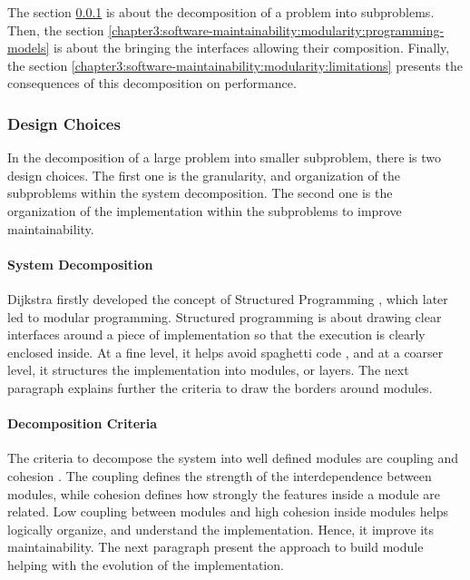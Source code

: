 The section \ref{chapter3:software-maintainability:modularity:design-choices} is about the decomposition of a problem into subproblems.
Then, the section \ref{chapter3:software-maintainability:modularity:programming-models} is about the bringing the interfaces allowing their composition.
Finally, the section \ref{chapter3:software-maintainability:modularity:limitations} presents the consequences of this decomposition on performance.


\subsubsection{Design Choices} \label{chapter3:software-maintainability:modularity:design-choices}

In the decomposition of a large problem into smaller subproblem, there is two design choices.
The first one is the granularity, and organization of the subproblems within the system decomposition.
The second one is the organization of the implementation within the subproblems to improve maintainability.

\paragraph{System Decomposition}


Dijkstra firstly developed the concept of Structured Programming \cite{Dijkstra1970}, which later led to modular programming.
Structured programming is about drawing clear interfaces around a piece of implementation so that the execution is clearly enclosed inside.
At a fine level, it helps avoid spaghetti code \cite{Dijkstra1968a}, and at a coarser level, it structures the implementation \cite{Dijkstra1968} into modules, or layers.
The next paragraph explains further the criteria to draw the borders around modules.


\paragraph{Decomposition Criteria}

The criteria to decompose the system into well defined modules are coupling and cohesion \cite{Stevens1974}.
The coupling defines the strength of the interdependence between modules, while cohesion defines how strongly the features inside a module are related.
Low coupling between modules and high cohesion inside modules helps logically organize, and understand the implementation.
Hence, it improve its maintainability.
The next paragraph present the approach to build module helping with the evolution of the implementation.

